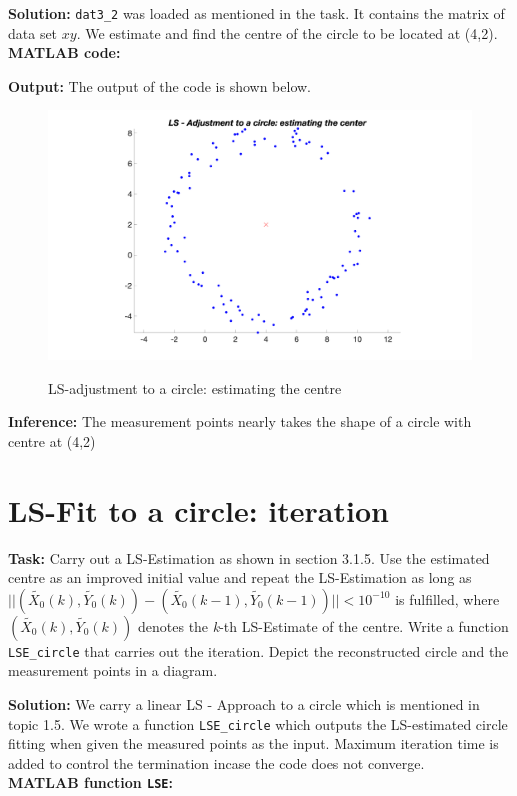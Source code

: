 \noindent \textbf{Solution:} \texttt{dat3\_2} was loaded as mentioned in the task. It contains the matrix of data set $xy.$ We estimate and find the centre of the circle to be located at (4,2).\\ 
\noindent \textbf{MATLAB code:} 

\newpage
\noindent \textbf{Output:} The output of the code is shown below. 
\begin{figure}[H]
\centering
{\includegraphics[scale=0.15]{ass6_1.png}}
\caption{LS-adjustment to a circle: estimating the centre }
\label{LS-adjustment to a circle: estimating the centre }
\end{figure}

\noindent \textbf{Inference:} The measurement points nearly takes the shape of a circle with centre at (4,2)



\section{ LS-Fit to a circle: iteration }  \label{ LS-Fit to a circle: iteration }
\noindent \textbf{Task:} Carry out a LS-Estimation as shown in section 3.1.5. Use the estimated centre as an improved initial value and repeat the LS-Estimation as long as $ ||(\tilde{X_0}(k), \tilde{Y_0}(k)) - (\tilde{X_0}(k-1), \tilde{Y_0}(k-1))|| < 10^{-10} $ is fulfilled, where $ (\tilde{X_0}(k), \tilde{Y_0}(k)) $ denotes the \textit{k}-th LS-Estimate of the centre. Write a function \texttt{LSE\_circle} that carries out the iteration. Depict the reconstructed circle and the measurement points in a diagram.


\noindent \textbf{Solution:} We carry a linear LS - Approach to a circle which is mentioned in topic 1.5. We wrote a function \texttt{LSE\_circle} which outputs the LS-estimated circle fitting when given the measured points as the input. Maximum iteration time is added to control the termination incase the code does not converge.\\
\noindent \textbf{MATLAB function \texttt{LSE}:}


